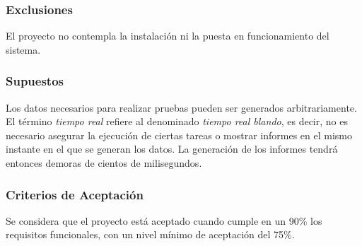 \subsubsection{Exclusiones}
El proyecto no contempla la instalación ni la puesta en funcionamiento del sistema.

\subsubsection{Supuestos}
Los datos necesarios para realizar pruebas pueden ser generados arbitrariamente.
El término \textit{tiempo real} refiere al denominado \textit{tiempo real blando}, es decir, no es necesario asegurar la ejecución de ciertas tareas o mostrar informes en el mismo instante en el que se generan los datos. La generación de los informes tendrá entonces demoras de cientos de milisegundos.

\subsubsection{Criterios de Aceptación}
Se considera que el proyecto está aceptado cuando cumple en un 90\% los requisitos funcionales, con un nivel mínimo de aceptación del 75\%.


